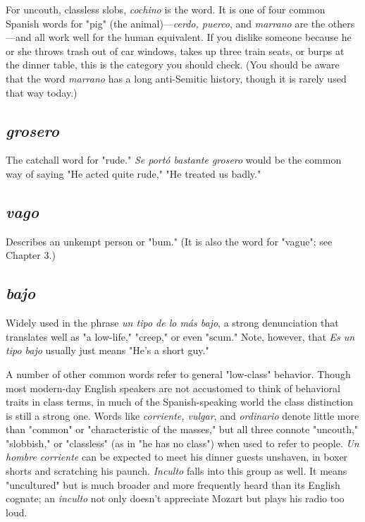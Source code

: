 \documentclass[14pt,a4paper,oneside]{memoir}
\newcommand{\bsk}{\vspace{20pt}}
\begin{document}
For uncouth, classless slobs, \emph{cochino} is the word. It is one of
four common Spanish words for "pig" (the animal)---\emph{cerdo, puerco},
and \emph{marrano} are the others---and all work well for the human equivalent. If you dislike someone because he or she throws trash out of car
windows, takes up three train seats, or burps at the dinner table, this is
the category you should check. (You should be aware that the word
\emph{marrano} has a long anti-Semitic history, though it is rarely used that
way today.)

\subsection{\emph{grosero}}

The catchall word for "rude." \emph{Se portó bastante
	grosero} would be the common way of saying "He acted quite rude,"
"He treated us badly."

\subsection{\emph{vago}}

Describes an unkempt person or "bum." (It is also the
word for "vague"; see Chapter 3.)

\subsection{\emph{bajo}}

Widely used in the phrase \emph{un tipo de lo más bajo}, a
strong denunciation that translates well as "a low-life," "creep," or
even "scum." Note, however, that \emph{Es un tipo bajo} usually just means
"He's a short guy."

\bsk

A number of other common words refer to general "low-class"
behavior. Though most modern-day English speakers are not accustomed to think of behavioral traits in class terms, in much of the
Spanish-speaking world the class distinction is still a strong one.
Words like \emph{corriente, vulgar}, and \emph{ordinario} denote little more than
"common" or "characteristic of the masses," but all three connote
"uncouth," "slobbish," or "classless" (as in "he has no class") when
used to refer to people. \emph{Un hombre corriente} can be expected to meet
his dinner guests unshaven, in boxer shorts and scratching his paunch.
\emph{Inculto} falls into this group as well. It means "uncultured" but is
much broader and more frequently heard than its English cognate; an
\emph{inculto} not only doesn't appreciate Mozart but plays his radio too loud.
\end{document}
